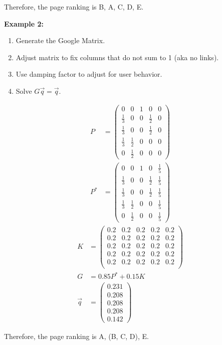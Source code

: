 \noindent
Therefore, the page ranking is B, A, C, D, E.

\noindent
\newline
\textbf{Example 2:}
\begin{enumerate}
    \item Generate the Google Matrix.
    \item Adjust matrix to fix columns that do not sum to 1 (aka no links).
    \item Use damping factor to adjust for user behavior.
    \item Solve \(G\Vec{q}=\Vec{q}\).
\end{enumerate}
\begin{align}
    P &= \begin{pmatrix}
        0 & 0 & 1 & 0 & 0 \\
        \frac{1}{3} & 0 & 0 & \frac{1}{2} & 0 \\
        \frac{1}{3} & 0 & 0 & \frac{1}{2} & 0 \\
        \frac{1}{3} & \frac{1}{2} & 0 & 0 & 0 \\
        0 & \frac{1}{2} & 0 & 0 & 0
    \end{pmatrix} \\
    P^* &= \begin{pmatrix}
        0 & 0 & 1 & 0 & \frac{1}{5} \\
        \frac{1}{3} & 0 & 0 & \frac{1}{2} & \frac{1}{5} \\
        \frac{1}{3} & 0 & 0 & \frac{1}{2} & \frac{1}{5} \\
        \frac{1}{3} & \frac{1}{2} & 0 & 0 & \frac{1}{5} \\
        0 & \frac{1}{2} & 0 & 0 & \frac{1}{5}
    \end{pmatrix}
\end{align}
\begin{align}
    K &= \begin{pmatrix}
        0.2 & 0.2 & 0.2 & 0.2 & 0.2 \\
        0.2 & 0.2 & 0.2 & 0.2 & 0.2 \\
        0.2 & 0.2 & 0.2 & 0.2 & 0.2 \\
        0.2 & 0.2 & 0.2 & 0.2 & 0.2 \\
        0.2 & 0.2 & 0.2 & 0.2 & 0.2 \\
    \end{pmatrix} \\
    G &= 0.85 P^* + 0.15 K \\
    \Vec{q} &= \begin{pmatrix}
        0.231 \\ 0.208 \\ 0.208 \\ 0.208 \\ 0.142
    \end{pmatrix}
\end{align}

\noindent
Therefore, the page ranking is A, (B, C, D), E.
